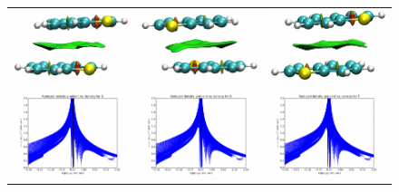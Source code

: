 \begin{figure}[H]
\begin{center}
\begin{tabular}{c c c}
					\includegraphics{image/image/P1-F821} & \includegraphics{image/image/P1-F822} & \includegraphics{image/image/P1-F823}\\
					\includegraphics{image/image/P1-F831} & \includegraphics{image/image/P1-F832} & \includegraphics{image/image/P1-F833}\\

\end{tabular}
\end{center}
\end{figure}
